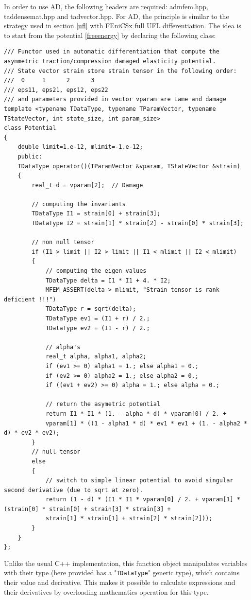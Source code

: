 \documentclass[12pt]{article}
\newcommand{\mycode}[1]{\textsf{"}\lstinline`#1`\textsf{"}}
\begin{document}
In order to use AD, the following headers are required:
admfem.hpp, taddensemat.hpp and tadvector.hpp. For AD, the principle is similar to the strategy used in section \ref{ufl} with FEniCSx full UFL differentiation. The idea is to start from the potential \eqref{freeenergy} by declaring the following class:

\begin{lstlisting}[numbers=none,basicstyle=\scriptsize]
/// Functor used in automatic differentiation that compute the asymmetric traction/compression damaged elasticity potential.
/// State vector strain store strain tensor in the following order:
///  0     1      2      3
/// eps11, eps21, eps12, eps22
/// and parameters provided in vector vparam are Lame and damage
template <typename TDataType, typename TParamVector, typename TStateVector, int state_size, int param_size>
class Potential
{
	double limit=1.e-12, mlimit=-1.e-12;
	public:
	TDataType operator()(TParamVector &vparam, TStateVector &strain)
	{
		real_t d = vparam[2];  // Damage
		
		// computing the invariants
		TDataType I1 = strain[0] + strain[3];
		TDataType I2 = strain[1] * strain[2] - strain[0] * strain[3];
		
		// non null tensor
		if (I1 > limit || I2 > limit || I1 < mlimit || I2 < mlimit)
		{
			// computing the eigen values
			TDataType delta = I1 * I1 + 4. * I2;
			MFEM_ASSERT(delta > mlimit, "Strain tensor is rank deficient !!!")
			TDataType r = sqrt(delta);
			TDataType ev1 = (I1 + r) / 2.;
			TDataType ev2 = (I1 - r) / 2.;
			
			// alpha's
			real_t alpha, alpha1, alpha2;
			if (ev1 >= 0) alpha1 = 1.; else alpha1 = 0.;
			if (ev2 >= 0) alpha2 = 1.; else alpha2 = 0.;
			if ((ev1 + ev2) >= 0) alpha = 1.; else alpha = 0.;
			
			// return the asymetric potential
			return I1 * I1 * (1. - alpha * d) * vparam[0] / 2. +
			vparam[1] * ((1 - alpha1 * d) * ev1 * ev1 + (1. - alpha2 * d) * ev2 * ev2);
		}
		// null tensor
		else
		{
			// switch to simple linear potential to avoid singular second derivative (due to sqrt at zero). 
			return (1 - d) * (I1 * I1 * vparam[0] / 2. + vparam[1] * (strain[0] * strain[0] + strain[3] * strain[3] +
			strain[1] * strain[1] + strain[2] * strain[2]));
		}
	}
};
\end{lstlisting}
Unlike the usual C++ implementation, this function object manipulates variables with their type (here provided has  a  \mycode{TDataType} generic type), which contains their value and derivative. This makes it possible to calculate expressions and their derivatives by overloading mathematics operation for this type.
\end{document}
